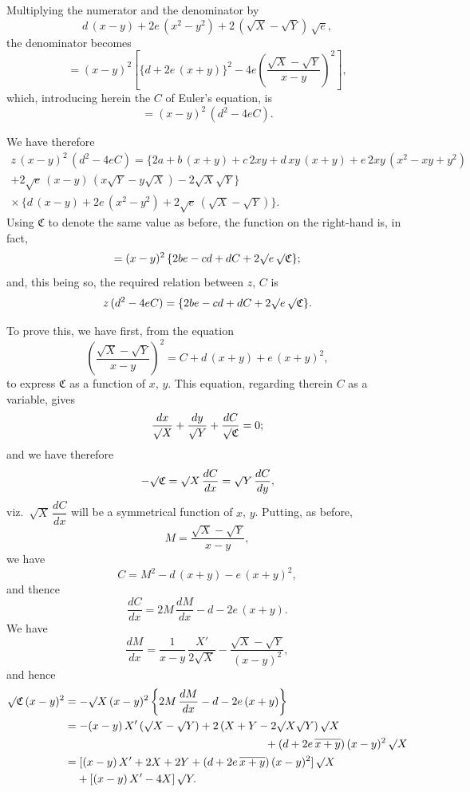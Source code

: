 \documentclass[12pt,a4paper]{article}
\begin{document}
Multiplying the numerator and the denominator by
\[
d\,(x-y) + 2e\,(x^2-y^2) + 2\,(\surd X - \surd Y)\,\surd e,
\]
the denominator becomes
\[
= (x-y)^2\left[\{d + 2e\,(x+y)\}^2 - 4e\left(\frac{\surd X - \surd Y}{x-y}\right)^2\right],
\]
which, introducing herein the $C$ of Euler's equation, is
\[
= (x-y)^2\,(d^2 - 4eC).
\]

We have therefore
\begin{multline*}
z\,(x-y)^2\,(d^2 - 4eC) = \{2a + b\,(x+y) + c\,2xy + d\,xy\,(x+y) + e\,2xy\,(x^2-xy+y^2) \\ + 2\surd e\,(x-y)\,(x\surd Y - y\surd X) - 2\surd X\surd Y\} \\ \times\,\{d\,(x-y) + 2e\,(x^2-y^2) + 2\surd e\,(\surd X - \surd Y)\}.
\end{multline*}
Using $\mathfrak{C}$ to denote the same value as before, the function on the right-hand is, in fact,
\[
= (x-y)^2\,\{2be - cd + dC + 2\surd e\,\surd\mathfrak{C}\};
\]
and, this being so, the required relation between $z$, $C$ is
\[
z\,(d^2 - 4eC) = \{2be - cd + dC + 2\surd e\,\surd\mathfrak{C}\}.
\]

\newpage

\noindent
To prove this, we have first, from the equation
\[
\left(\frac{\surd X - \surd Y}{x-y}\right)^2 = C + d\,(x+y) + e\,(x+y)^2,
\]
to express $\mathfrak{C}$ as a function of $x$, $y$. This equation, regarding therein $C$ as a variable, gives
\[
\frac{dx}{\surd X} + \frac{dy}{\surd Y} + \frac{dC}{\surd\mathfrak{C}} = 0;
\]
and we have therefore
\[
-\surd\mathfrak{C} = \surd X\,\frac{dC}{dx} = \surd Y\,\frac{dC}{dy},
\]
viz.\ $\surd X\,\dfrac{dC}{dx}$ will be a symmetrical function of $x$, $y$. Putting, as before,
\[
M = \frac{\surd X - \surd Y}{x-y},
\]
we have
\[
C = M^2 - d\,(x+y) - e\,(x+y)^2,
\]
and thence
\[
\frac{dC}{dx} = 2M\,\frac{dM}{dx} - d - 2e\,(x+y).
\]
We have
\[
\frac{dM}{dx} = \frac{1}{x-y}\,\frac{X'}{2\surd X} - \frac{\surd X - \surd Y}{(x-y)^2},
\]
and hence
\begin{align*}
\surd\mathfrak{C}\,(x-y)^2 &= -\surd X\,(x-y)^2\left\{2M\,\frac{dM}{dx} - d - 2e\,(x+y)\right\} \\
&= -(x-y)\,X'\,(\surd X - \surd Y) + 2\,(X+Y-2\surd X\surd Y)\,\surd X \\
&\qquad\qquad\qquad\qquad\qquad\qquad\qquad\qquad\qquad + (d+2e\,\overline{x+y})\,(x-y)^2\,\surd X \\
&= \phantom{}[(x-y)\,X' + 2X + 2Y + (d+2e\,\overline{x+y})\,(x-y)^2]\,\surd X \\
&\phantom{=\;} + [(x-y)\,X' - 4X]\,\surd Y.
\end{align*}
\end{document}
